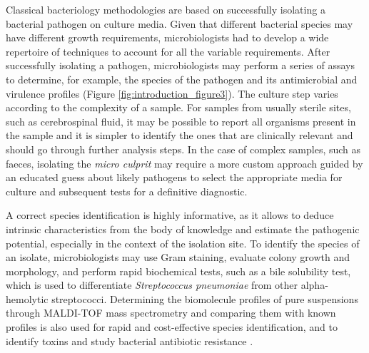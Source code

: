 Classical bacteriology methodologies are based on successfully isolating a bacterial pathogen on culture media. Given that different bacterial species may have different growth requirements, microbiologists had to develop a wide repertoire of techniques to account for all the variable requirements. After successfully isolating a pathogen, microbiologists may perform a series of assays to determine, for example, the species of the pathogen and its antimicrobial and virulence profiles (Figure \ref{fig:introduction_figure3}). The culture step varies according to the complexity of a sample. For samples from usually sterile sites, such as cerebrospinal fluid, it may be possible to report all organisms present in the sample and it is simpler to identify the ones that are clinically relevant and should go through further analysis steps. In the case of complex samples, such as faeces, isolating the \textit{micro culprit} may require a more custom approach guided by an educated guess about likely pathogens to select the appropriate media for culture and subsequent tests for a definitive diagnostic.

A correct species identification is highly informative, as it allows to deduce intrinsic characteristics from the body of knowledge and estimate the pathogenic potential, especially in the context of the isolation site. To identify the species of an isolate, microbiologists may use Gram staining, evaluate colony growth and morphology, and perform rapid biochemical tests, such as a bile solubility test, which is used to differentiate \textit{Streptococcus pneumoniae} from other alpha-hemolytic streptococci. Determining the biomolecule profiles of pure suspensions through \ac{MALDI-TOF} mass spectrometry and comparing them with known profiles is also used for rapid and cost-effective species identification, and to identify toxins and study bacterial antibiotic resistance \cite{croxatto_applications_2012, lasch_maldi-tof_2025, alizadeh_maldi-tof_2021, seng_ongoing_2009, idelevich_rapid_2018}.

